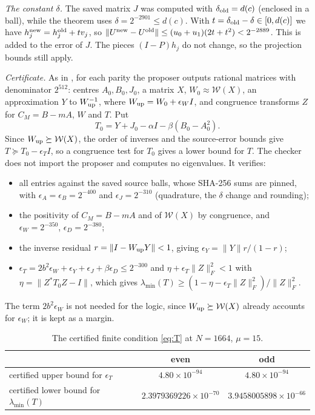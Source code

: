 \documentclass[11pt]{amsart}
\theoremstyle{remark}
\numberwithin{equation}{section}
\begin{document}
\emph{The constant $\delta$.} The saved matrix $J$ was computed with $\delta_{\rm old}=d(c)$ (enclosed in a ball), while the theorem uses $\delta=2^{-2901}\le d(c)$. With $t=\delta_{\rm old}-\delta\in[0,d(c)]$ we have $h_j^{\rm new}=h_j^{\rm old}+tv_j$, so $\|U^{\rm new}-U^{\rm old}\|\le(u_0+u_1)(2t+t^2)<2^{-2889}$. This is added to the error of $J$. The pieces $(I-P)h_j$ do not change, so the projection bounds still apply.

\emph{Certificate.} As in \cite[Section~5]{MoriVII}, for each parity the proposer outputs rational matrices with denominator $2^{512}$: centres $A_0,B_0,J_0$, a matrix $X$, $W_0\approx\mathcal W(X)$, an approximation $Y$ to $W_{\rm up}^{-1}$, where $W_{\rm up}=W_0+\epsilon_WI$, and congruence transforms $Z$ for $C_M=B-mA$, $W$ and $T$. Put
\[
T_0=Y+J_0-\alpha I-\beta(B_0-A_0^2).
\]
Since $W_{\rm up}\succeq\mathcal W(X)$, the order of inverses and the source-error bounds give $T\succeq T_0-\epsilon_TI$, so a congruence test for $T_0$ gives a lower bound for $T$. The checker does not import the proposer and computes no eigenvalues. It verifies:
\begin{itemize}
\item all entries against the saved source balls, whose SHA-256 sums are pinned, with $\epsilon_A=\epsilon_B=2^{-400}$ and $\epsilon_J=2^{-310}$ (quadrature, the $\delta$ change and rounding);
\item the positivity of $C_M=B-mA$ and of $\mathcal W(X)$ by congruence, and $\epsilon_W=2^{-350}$, $\epsilon_D=2^{-380}$;
\item the inverse residual $r=\|I-W_{\rm up}Y\|<1$, giving $\epsilon_Y=\|Y\|r/(1-r)$;
\item $\epsilon_T=2b^2\epsilon_W+\epsilon_Y+\epsilon_J+\beta\epsilon_D\le2^{-300}$ and $\eta+\epsilon_T\|Z\|_F^2<1$ with $\eta=\|Z^*T_0Z-I\|$, which gives $\lambda_{\min}(T)\ge(1-\eta-\epsilon_T\|Z\|_F^2)/\|Z\|_F^2$.
\end{itemize}
The term $2b^2\epsilon_W$ is not needed for the logic, since $W_{\rm up}\succeq\mathcal W(X)$ already accounts for $\epsilon_W$; it is kept as a margin.

\begin{table}[h]
\centering\small
\begin{tabular}{lcc}
\toprule
& even & odd\\
\midrule
certified upper bound for $\epsilon_T$ & $4.80\times10^{-94}$ & $4.80\times10^{-94}$\\
certified lower bound for $\lambda_{\min}(T)$ & $2.3979369226\times10^{-70}$ & $3.9458005898\times10^{-66}$\\
\bottomrule
\end{tabular}
\caption{The certified finite condition \eqref{eq:T} at $N=1664$, $\mu=15$.}
\end{table}
\end{document}
